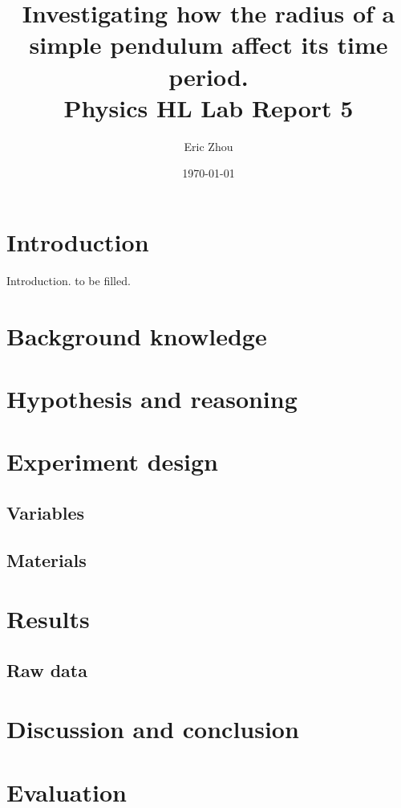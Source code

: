 \documentclass[letterpaper, 12pt]{CSUniSchoolLabReport}
\begin{document}
\begin{titlepage}
    \title{\textbf{Investigating how the radius of a simple pendulum affect its time period. \\ \small Physics HL Lab Report 5}}
    \author{Eric Zhou}
    \date{\today}
    \maketitle
\end{titlepage}

\section{Introduction}

Introduction. to be filled.

\section{Background knowledge}

\section{Hypothesis and reasoning}

\section{Experiment design}

\subsection{Variables}

\subsection{Materials}

\section{Results}

\subsection{Raw data}



\section{Discussion and conclusion}

\section{Evaluation}
\end{document}
